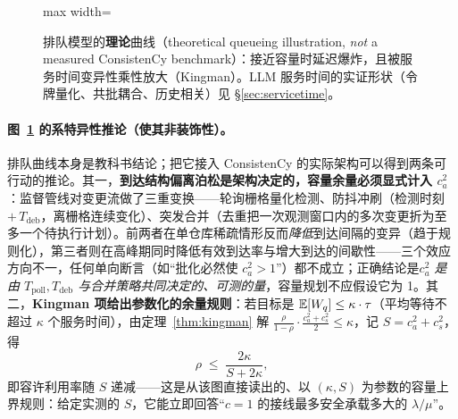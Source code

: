 \begin{figure}[htbp]
\centering
\begin{adjustbox}{max width=\textwidth}
\end{adjustbox}
\caption{排队模型的\textbf{理论}曲线（theoretical queueing illustration, \emph{not} a measured ConsistenCy benchmark）：接近容量时延迟爆炸，且被服务时间变异性乘性放大（Kingman）。LLM 服务时间的实证形状（令牌量化、共批耦合、历史相关）见 \S\ref{sec:servicetime}。}
\label{fig:queueing}
\end{figure}

\paragraph{图~\ref{fig:queueing} 的系特异性推论（使其非装饰性）。}
排队曲线本身是教科书结论；把它接入 ConsistenCy 的实际架构可以得到两条可行动的推论。其一，\textbf{到达结构偏离泊松是架构决定的，容量余量必须显式计入 $c_a^2$}：监督管线对变更流做了三重变换——轮询栅格量化检测、防抖冲刷（检测时刻 $+\,T_{\mathrm{deb}}$，离栅格连续变化）、突发合并（去重把一次观测窗口内的多次变更折为至多一个待执行计划）。前两者在单仓库稀疏情形反而\emph{降低}到达间隔的变异（趋于规则化），第三者则在高峰期同时降低有效到达率与增大到达的间歇性——三个效应方向不一，任何单向断言（如“批化必然使 $c_a^2>1$”）都不成立；正确结论是\emph{$c_a^2$ 是由 $T_{\mathrm{poll}},T_{\mathrm{deb}}$ 与合并策略共同决定的、可测的量}，容量规划不应假设它为 1。其二，\textbf{Kingman 项给出参数化的余量规则}：若目标是 $\operatorname{\mathbb{E}}[W_q]\le\kappa\cdot\tau$（平均等待不超过 $\kappa$ 个服务时间），由定理~\ref{thm:kingman} 解 $\frac{\rho}{1-\rho}\cdot\frac{c_a^2+c_s^2}{2}\le\kappa$，记 $S=c_a^2+c_s^2$，得
\begin{equation}
\rho\;\le\;\frac{2\kappa}{S+2\kappa},
\end{equation}
即容许利用率随 $S$ 递减——这是从该图直接读出的、以 $(\kappa,S)$ 为参数的容量上界规则：给定实测的 $S$，它能立即回答“$c=1$ 的接线最多安全承载多大的 $\lambda/\mu$”。

